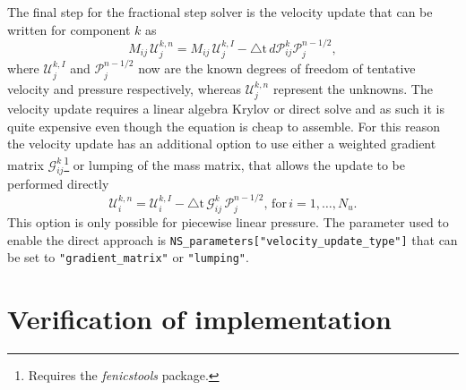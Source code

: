 \documentclass[final,3p,times,twocolumn]{elsarticle}
\newcommand{\inpyth}{\lstinline[style=inlinestyle]} %[]%
\begin{document}
The final step for the fractional step solver is the velocity update that can be written for component $k$ as
\begin{equation}
 M_{ij}\,\mathcal{U}_j^{k,n} =  M_{ij}\,\mathcal{U}_j^{k, I} - \triangle \text{t} \,d\mathcal{P}_{ij}^{k} \mathcal{P}_j^{n-1/2}, 
 \label{eq:velocity_update}
\end{equation}
where $\mathcal{U}_j^{k, I}$ and $\mathcal{P}_j^{n-1/2}$ now are the known degrees of freedom of tentative velocity and pressure respectively, whereas $\mathcal{U}_j^{k, n}$ represent the unknowns. The velocity update requires a linear algebra Krylov or direct solve and as such it is quite expensive even though the equation is cheap to assemble. For this reason the velocity update has an additional option to use either a weighted gradient matrix $\mathcal{G}_{ij}^k$\footnote{Requires the \emph{fenicstools} \cite{fenicstools} package.} or lumping of the mass matrix, that allows the update to be performed directly
\begin{equation}
\mathcal{U}_i^{k, n} =  \mathcal{U}_i^{k, I} - \triangle \text{t} \, \mathcal{G}_{ij}^k \, \mathcal{P}_j^{n-1/2}, \,\text{for}\, i = 1, \ldots, N_u.
\end{equation}
This option is only possible for piecewise linear pressure. The parameter used to enable the direct approach is \inpyth{NS_parameters["velocity_update_type"]} that can be set to \inpyth{"gradient_matrix"} or \inpyth{"lumping"}.

\section{Verification of implementation}
\label{sec:benchmark}
\end{document}
